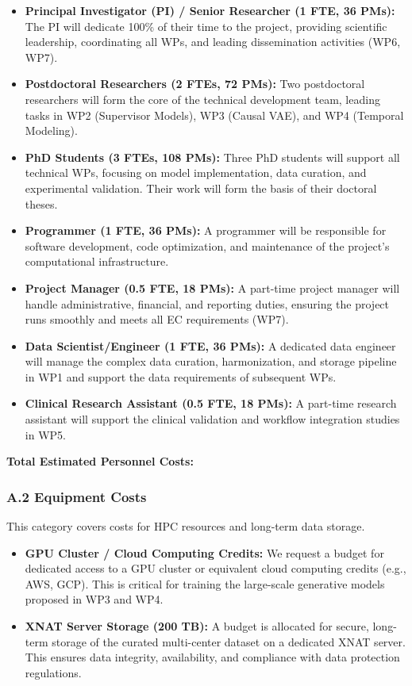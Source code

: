 \begin{itemize}
    \item \textbf{Principal Investigator (PI) / Senior Researcher (1 FTE, 36 PMs):} The PI will dedicate 100\% of their time to the project, providing scientific leadership, coordinating all WPs, and leading dissemination activities (WP6, WP7).
    \item \textbf{Postdoctoral Researchers (2 FTEs, 72 PMs):} Two postdoctoral researchers will form the core of the technical development team, leading tasks in WP2 (Supervisor Models), WP3 (Causal VAE), and WP4 (Temporal Modeling).
    \item \textbf{PhD Students (3 FTEs, 108 PMs):} Three PhD students will support all technical WPs, focusing on model implementation, data curation, and experimental validation. Their work will form the basis of their doctoral theses.
    \item \textbf{Programmer (1 FTE, 36 PMs):} A programmer will be responsible for software development, code optimization, and maintenance of the project's computational infrastructure.
    \item \textbf{Project Manager (0.5 FTE, 18 PMs):} A part-time project manager will handle administrative, financial, and reporting duties, ensuring the project runs smoothly and meets all EC requirements (WP7).
    \item \textbf{Data Scientist/Engineer (1 FTE, 36 PMs):} A dedicated data engineer will manage the complex data curation, harmonization, and storage pipeline in WP1 and support the data requirements of subsequent WPs.
    \item \textbf{Clinical Research Assistant (0.5 FTE, 18 PMs):} A part-time research assistant will support the clinical validation and workflow integration studies in WP5.
\end{itemize}

\textbf{Total Estimated Personnel Costs: }

\subsubsection*{A.2 Equipment Costs}
This category covers costs for HPC resources and long-term data storage.
\begin{itemize}
    \item \textbf{GPU Cluster / Cloud Computing Credits:} We request a budget for dedicated access to a GPU cluster or equivalent cloud computing credits (e.g., AWS, GCP). This is critical for training the large-scale generative models proposed in WP3 and WP4.
    \item \textbf{XNAT Server Storage (200 TB):} A budget is allocated for secure, long-term storage of the curated multi-center dataset on a dedicated XNAT server. This ensures data integrity, availability, and compliance with data protection regulations.
\end{itemize}

